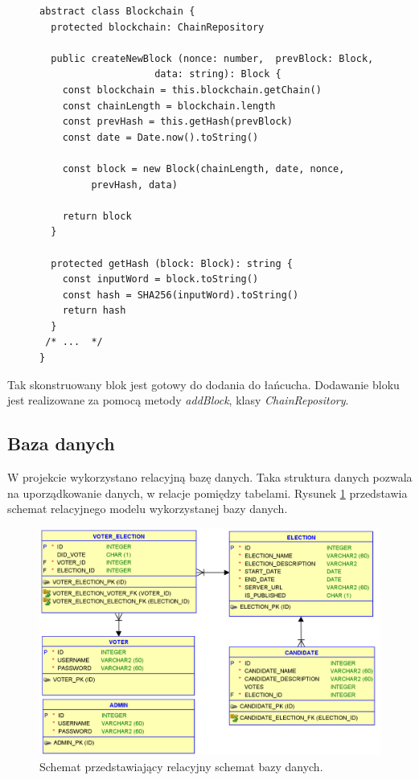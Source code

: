 \documentclass[a4paper,12pt]{book}
\begin{document}
\newpage
\begin{figure}  
  \centering
\begin{lstlisting}[style=ES6, caption={Fragment klasy Blockchain.},label={Blockchain1.ts}]
abstract class Blockchain {
  protected blockchain: ChainRepository

  public createNewBlock (nonce: number,  prevBlock: Block, 
					data: string): Block {
    const blockchain = this.blockchain.getChain()
    const chainLength = blockchain.length
    const prevHash = this.getHash(prevBlock)
    const date = Date.now().toString()

    const block = new Block(chainLength, date, nonce,
		 prevHash, data)

    return block
  }

  protected getHash (block: Block): string {
    const inputWord = block.toString()
    const hash = SHA256(inputWord).toString()
    return hash
  }
 /* ...  */
}
\end{lstlisting}
\end{figure}
Tak skonstruowany blok jest gotowy do dodania do łańcucha. Dodawanie bloku jest realizowane za pomocą metody \textit{addBlock}, klasy \textit{ChainRepository}.

\subsection{Baza danych}

W projekcie wykorzystano relacyjną bazę danych. Taka struktura danych pozwala na uporządkowanie danych, w relacje pomiędzy tabelami. Rysunek \ref{database} przedstawia schemat relacyjnego modelu wykorzystanej bazy danych.

\begin{figure}[h]
    	\centering
	\includegraphics[width=\textwidth]{images/Relational.png}
	\caption{Schemat przedstawiający relacyjny schemat bazy danych.}\label{database}
\end {figure}
\end{document}
